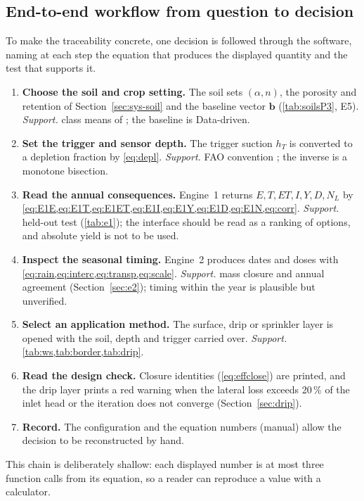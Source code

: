 \subsection{End-to-end workflow from question to decision}
\label{sec:workflow}
To make the traceability concrete, one decision is followed through the software, naming at each step the equation that produces the displayed quantity and the test that supports it.
\begin{enumerate}[label=\textbf{Step \arabic*.}]
\item \textbf{Choose the soil and crop setting.} The soil sets $(\alpha,n)$, the porosity and retention of Section~\ref{sec:sys-soil} and the baseline vector $\mathbf b$ (\cref{tab:soilsP3}, E5). \emph{Support.} class means of \citet{Carsel1988}; the baseline is Data-driven.
\item \textbf{Set the trigger and sensor depth.} The trigger suction $h_T$ is converted to a depletion fraction by \cref{eq:depl}. \emph{Support.} FAO convention \citep{Allen1998}; the inverse is a monotone bisection.
\item \textbf{Read the annual consequences.} Engine~1 returns $E,T,\mathit{ET},I,Y,D,N_L$ by \cref{eq:E1E,eq:E1T,eq:E1ET,eq:E1I,eq:E1Y,eq:E1D,eq:E1N,eq:corr}. \emph{Support.} held-out test (\cref{tab:e1}); the interface should be read as a ranking of options, and absolute yield is not to be used.
\item \textbf{Inspect the seasonal timing.} Engine~2 produces dates and doses with \cref{eq:rain,eq:interc,eq:transp,eq:scale}. \emph{Support.} mass closure and annual agreement (Section~\ref{sec:e2}); timing within the year is plausible but unverified.
\item \textbf{Select an application method.} The surface, drip or sprinkler layer is opened with the soil, depth and trigger carried over. \emph{Support.} \cref{tab:ws,tab:border,tab:drip}.
\item \textbf{Read the design check.} Closure identities (\cref{eq:effclose}) are printed, and the drip layer prints a red warning when the lateral loss exceeds 20\,\% of the inlet head or the iteration does not converge (Section~\ref{sec:drip}).
\item \textbf{Record.} The configuration and the equation numbers (manual) allow the decision to be reconstructed by hand.
\end{enumerate}
This chain is deliberately shallow: each displayed number is at most three function calls from its equation, so a reader can reproduce a value with a calculator.

